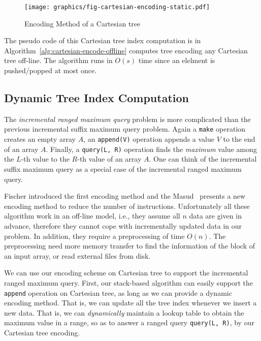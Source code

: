 \begin{figure}[!thb]
  \centering
  \texttt{[image: graphics/fig-cartesian-encoding-static.pdf]}
  \label{fig:fig-cartesian-encoding-static}
  \caption{Encoding Method of a Cartesian tree}
\end{figure}

The pseudo code of this Cartesian tree index computation is in
Algorithm~\ref{alg:cartesian-encode-offline} computes tree encoding
any Cartesian tree off-line.  The algorithm runs in $O(s)$ time since
an elelment is pushed/popped at most once.



\subsection{Dynamic Tree Index Computation}


The {\em incremental ranged maximum query} problem is more complicated
than the previous incremental suffix maximum query problem.  Again a
{\tt make} operation creates an empty array $A$, an {\tt append(V)}
operation appends a value $V$ to the end of an array $A$.  Finally, a
{\tt query(L, R)} operation finds the {\em maximum} value among the
$L$-th value to the $R$-th value of an array $A$.  One can think of
the incremental suffix maximum query as a special case of the
incremental ranged maximum query.

Fischer introduced the first encoding method and the
Masud~\cite{Hasan2010CacheOA} presents a new encoding method to reduce
the number of instructions.  Unfortunately all these algorithm work in
an off-line model, i.e., they assume all $n$ data are given in
advance, therefore they cannot cope with incrementally updated data in
our problem.  In addition, they require a preprocessing of time
$O(n)$.  The preprocessing need more memory transfer to find the
information of the block of an input array, or read external files
from disk.


We can use our encoding scheme on Cartesian tree to support the
incremental ranged maximum query.  First, our stack-based algorithm
can easily support the {\tt append} operation on Cartesian tree, as
long as we can provide a dynamic encoding method.  That is, we can
update all the tree index whenever we insert a new data.  That is, we
can {\em dynamically} maintain a lookup table to obtain the maximum
value in a range, so as to answer a ranged query {\tt query(L, R)},
by our Cartesian tree encoding.  

